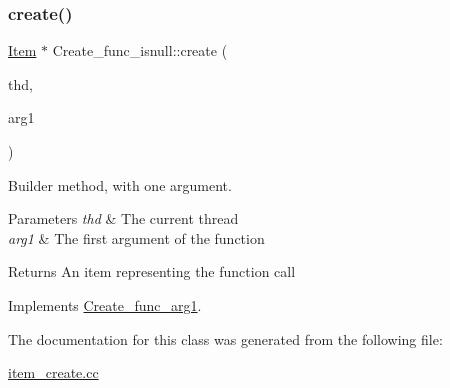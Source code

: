 \subsubsection{\texorpdfstring{create()}{create()}}
{\footnotesize\ttfamily \mbox{\hyperlink{classItem}{Item}} $\ast$ Create\+\_\+func\+\_\+isnull\+::create (\begin{DoxyParamCaption}\item[{T\+HD $\ast$}]{thd,  }\item[{\mbox{\hyperlink{classItem}{Item}} $\ast$}]{arg1 }\end{DoxyParamCaption})\hspace{0.3cm}{\ttfamily [virtual]}}

Builder method, with one argument. 
\begin{DoxyParams}{Parameters}
{\em thd} & The current thread \\
\hline
{\em arg1} & The first argument of the function \\
\hline
\end{DoxyParams}
\begin{DoxyReturn}{Returns}
An item representing the function call 
\end{DoxyReturn}


Implements \mbox{\hyperlink{classCreate__func__arg1_a3e9a98f755cd82c3e762e334c955a8c9}{Create\+\_\+func\+\_\+arg1}}.



The documentation for this class was generated from the following file\+:\begin{DoxyCompactItemize}
\item 
\mbox{\hyperlink{item__create_8cc}{item\+\_\+create.\+cc}}\end{DoxyCompactItemize}

